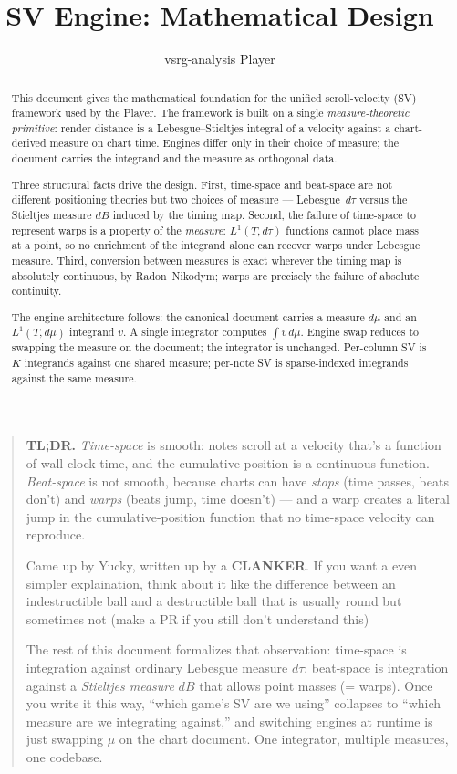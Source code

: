 \documentclass[11pt]{article}
\title{SV Engine: Mathematical Design}
\author{vsrg-analysis Player}
\date{}
\theoremstyle{definition}
\newcommand{\dtau}{\,d\tau}
\newcommand{\dmu}{\,d\mu}
\newcommand{\Lone}{L^{1}}
\begin{document}
\maketitle

\begin{quote}
\textbf{TL;DR.} \emph{Time-space} is smooth: notes scroll at a velocity that's
a function of wall-clock time, and the cumulative position is a continuous
function. \emph{Beat-space} is not smooth, because charts can have
\emph{stops} (time passes, beats don't) and \emph{warps} (beats jump, time
doesn't) --- and a warp creates a literal jump in the cumulative-position
function that no time-space velocity can reproduce.

Came up by Yucky, written up by a \textbf{CLANKER}. If you want a even simpler explaination, 
think about it like the difference between an indestructible ball and a destructible
ball that is usually round but sometimes not (make a PR if you still don't understand this)

The rest of this document formalizes that observation: time-space is integration
against ordinary Lebesgue measure $d\tau$; beat-space is integration against a
\emph{Stieltjes measure} $dB$ that allows point masses (= warps). Once you
write it this way, ``which game's SV are we using'' collapses to ``which
measure are we integrating against,'' and switching engines at runtime is just
swapping $\mu$ on the chart document. One integrator, multiple measures, one
codebase.
\end{quote}

\begin{abstract}
This document gives the mathematical foundation for the unified scroll-velocity
(SV) framework used by the Player. The framework is built on a single
\emph{measure-theoretic primitive}: render distance is a Lebesgue--Stieltjes
integral of a velocity against a chart-derived measure on chart time. Engines
differ only in their choice of measure; the document carries the integrand and
the measure as orthogonal data.

Three structural facts drive the design. First, time-space and beat-space are
not different positioning theories but two choices of measure --- Lebesgue
$\dtau$ versus the Stieltjes measure $dB$ induced by the timing map.
Second, the failure of time-space to represent warps is a property of the
\emph{measure}: $\Lone(T, d\tau)$ functions cannot place mass at a point, so
no enrichment of the integrand alone can recover warps under Lebesgue measure.
Third, conversion between measures is exact wherever the timing map is
absolutely continuous, by Radon--Nikodym; warps are precisely the failure of
absolute continuity.

The engine architecture follows: the canonical document carries a measure $d\mu$
and an $\Lone(T, d\mu)$ integrand $v$. A single integrator computes
$\int v\dmu$. Engine swap reduces to swapping the measure on the document; the
integrator is unchanged. Per-column SV is $K$ integrands against one shared
measure; per-note SV is sparse-indexed integrands against the same measure.
\end{abstract}
\end{document}
